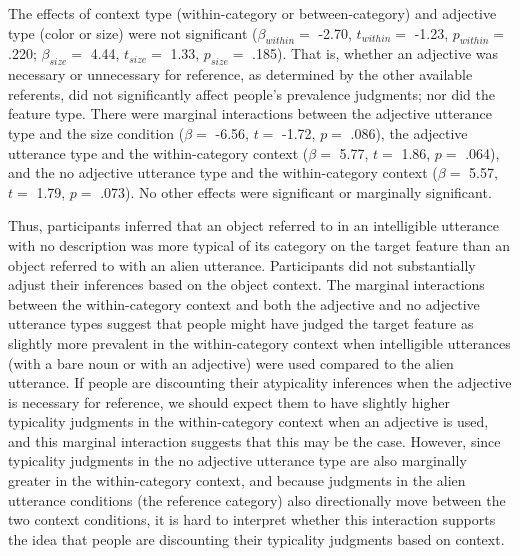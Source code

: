 \documentclass[
  english,
  man,floatsintext]{apa6}
\begin{document}
The effects of context type (within-category or between-category) and adjective type (color or size) were not significant (\(\beta_{within} =\) -2.70, \(t_{within} =\) -1.23, \(p_{within} =\) .220; \(\beta_{size} =\) 4.44, \(t_{size} =\) 1.33, \(p_{size} =\) .185). That is, whether an adjective was necessary or unnecessary for reference, as determined by the other available referents, did not significantly affect people's prevalence judgments; nor did the feature type. There were marginal interactions between the adjective utterance type and the size condition (\(\beta =\) -6.56, \(t =\) -1.72, \(p =\) .086), the adjective utterance type and the within-category context (\(\beta =\) 5.77, \(t =\) 1.86, \(p =\) .064), and the no adjective utterance type and the within-category context (\(\beta =\) 5.57, \(t =\) 1.79, \(p =\) .073). No other effects were significant or marginally significant.

Thus, participants inferred that an object referred to in an intelligible utterance with no description was more typical of its category on the target feature than an object referred to with an alien utterance. Participants did not substantially adjust their inferences based on the object context. The marginal interactions between the within-category context and both the adjective and no adjective utterance types suggest that people might have judged the target feature as slightly more prevalent in the within-category context when intelligible utterances (with a bare noun or with an adjective) were used compared to the alien utterance. If people are discounting their atypicality inferences when the adjective is necessary for reference, we should expect them to have slightly higher typicality judgments in the within-category context when an adjective is used, and this marginal interaction suggests that this may be the case. However, since typicality judgments in the no adjective utterance type are also marginally greater in the within-category context, and because judgments in the alien utterance conditions (the reference category) also directionally move between the two context conditions, it is hard to interpret whether this interaction supports the idea that people are discounting their typicality judgments based on context.
\end{document}
